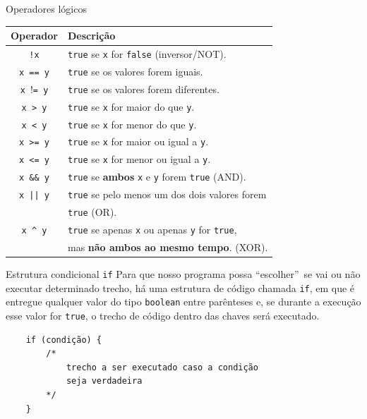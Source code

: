 \documentclass{beamer}
\begin{document}
\begin{frame}{Operadores lógicos}
    \begin{center}
        \begin{tabular}{|c|l|}
            \hline Operador & Descrição \\ \hline
            \texttt{!x} & \texttt{true} se \texttt{x} for \texttt{false} (inversor/NOT). \\
            \texttt{x == y} & \texttt{true} se os valores forem iguais. \\
            \texttt{x $!$= y} & \texttt{true} se os valores forem diferentes. \\
            \texttt{x > y} & \texttt{true} se \texttt{x} for maior do que \texttt{y}. \\
            \texttt{x < y} & \texttt{true} se \texttt{x} for menor do que \texttt{y}. \\
            \texttt{x >= y} & \texttt{true} se \texttt{x} for maior ou igual a \texttt{y}. \\
            \texttt{x <= y} & \texttt{true} se \texttt{x} for menor ou igual a \texttt{y}. \\
            \texttt{x \&\& y} & \texttt{true} se \textbf{ambos} \texttt{x} e \texttt{y} forem \texttt{true} (AND). \\
            \texttt{x || y} & \texttt{true} se pelo menos um dos dois valores forem \\
            & \texttt{true} (OR). \\
            \texttt{x \^{} y} & \texttt{true} se apenas \texttt{x} ou apenas \texttt{y} for \texttt{true}, \\
            & mas \textbf{não ambos ao mesmo tempo}. (XOR). \\
            \hline
        \end{tabular}
    \end{center}
\end{frame}

\begin{frame}[fragile]{Estrutura condicional \texttt{if}}
    Para que nosso programa possa ``escolher''\ se vai ou não executar determinado
    trecho, há uma estrutura de código chamada \texttt{if}, em que é entregue
    qualquer valor do tipo \texttt{boolean} entre parênteses e, se durante a
    execução esse valor for \texttt{true}, o trecho de código dentro das chaves
    será executado.

    \begin{verbatim}
    if (condição) {
        /*
            trecho a ser executado caso a condição
            seja verdadeira
        */
    }
    \end{verbatim}
\end{frame}
\end{document}
